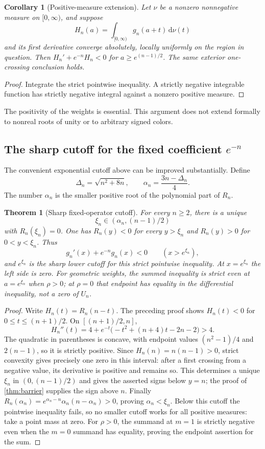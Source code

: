 \documentclass[11pt]{article}
\numberwithin{equation}{section}
\newtheorem{theorem}{Theorem}[section]
\newtheorem{corollary}[corollary]{Corollary}
\theoremstyle{definition}
\newcommand{\dd}{\,\mathrm d}
\begin{document}
\begin{corollary}[Positive-measure extension]\label{cor:measure}
Let $\nu$ be a nonzero nonnegative measure on $[0,\infty)$, and suppose
\[
 H_n(a)=\int_{[0,\infty)}g_n(a+t)\dd\nu(t)
\]
and its first derivative converge absolutely, locally uniformly on the
region in question. Then $H_n'+e^{-n}H_n<0$ for
$a\geq e^{(n-1)/2}$. The same exterior one-crossing conclusion holds.
\end{corollary}
\begin{proof}
Integrate the strict pointwise inequality. A strictly negative integrable
function has strictly negative integral against a nonzero positive measure.
\end{proof}

The positivity of the weights is essential. This argument does not extend
formally to nonreal roots of unity or to arbitrary signed colors.

\subsection{The sharp cutoff for the fixed coefficient \texorpdfstring{$e^{-n}$}{exp(-n)}}
The convenient exponential cutoff above can be improved substantially.
Define
\[
 \Delta_n=\sqrt{n^2+8n},\qquad
 \alpha_n=\frac{3n-\Delta_n}{4}.
\]
The number $\alpha_n$ is the smaller positive root of the polynomial part
of $R_n$.

\begin{theorem}[Sharp fixed-operator cutoff]\label{thm:sharp}
For every $n\geq2$, there is a unique
\begin{equation}\label{eq:xirange}
 \xi_n\in(\alpha_n,(n-1)/2)
\end{equation}
with $R_n(\xi_n)=0$. One has $R_n(y)<0$ for every $y>\xi_n$ and
$R_n(y)>0$ for $0<y<\xi_n$. Thus
\[
 g_n'(x)+e^{-n}g_n(x)<0\qquad(x>e^{\xi_n}),
\]
and $e^{\xi_n}$ is the sharp lower cutoff for this strict pointwise inequality.
At $x=e^{\xi_n}$ the left side is zero. For geometric weights, the summed
inequality is strict even at $a=e^{\xi_n}$ when $\rho>0$; at $\rho=0$ that
endpoint has equality in the differential inequality, not a zero of $U_n$.
\end{theorem}
\begin{proof}
Write $H_n(t)=R_n(n-t)$. The preceding proof shows $H_n(t)<0$ for
$0\leq t\leq(n+1)/2$. On $[(n+1)/2,n]$,
\[
 H_n''(t)=4+e^{-t}\bigl(-t^2+(n+4)t-2n-2\bigr)>4.
\]
The quadratic in parentheses is concave, with endpoint values
$(n^2-1)/4$ and $2(n-1)$, so it is strictly positive. Since
$H_n(n)=n(n-1)>0$, strict convexity gives precisely one zero in this
interval: after a first crossing from a negative value, its derivative is
positive and remains so. This determines a unique $\xi_n$ in
$(0,(n-1)/2)$ and gives the asserted signs below $y=n$; the proof of
\cref{thm:barrier} supplies the sign above $n$.
Finally $R_n(\alpha_n)=e^{\alpha_n-n}\alpha_n(n-\alpha_n)>0$, proving
$\alpha_n<\xi_n$. Below this cutoff the pointwise inequality fails, so no
smaller cutoff works for all positive measures: take a point mass at zero.
For $\rho>0$, the summand at $m=1$ is strictly negative even when the $m=0$
summand has equality, proving the endpoint assertion for the sum.
\end{proof}
\end{document}
